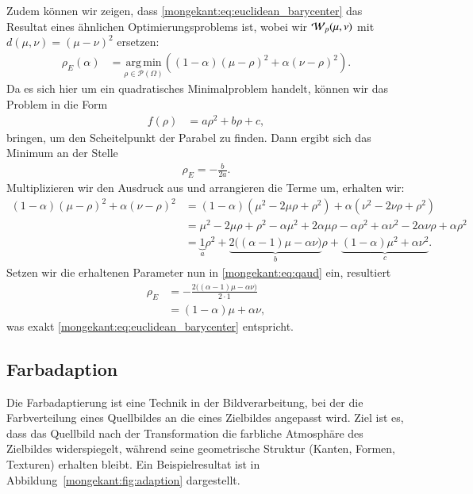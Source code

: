 Zudem können wir zeigen,
dass \eqref{mongekant:eq:euclidean_barycenter} das Resultat eines ähnlichen Optimierungsproblems ist,
wobei wir $\wasserstein(\mu, \nu)$ mit $d(\mu, \nu) = (\mu - \nu)^2$ ersetzen:
\begin{align*}
\rho_E(\alpha)
&=
\underset{\rho \in \mathcal{P}(\Omega)}{\mathrm{arg\,min}}\left(
(1-\alpha) (\mu - \rho)^2
+ \alpha (\nu - \rho)^2
\right)
.
\end{align*}
Da es sich hier um ein quadratisches Minimalproblem handelt,
können wir das Problem in die Form
\begin{align*}
f(\rho)
&=
a \rho^2 + b \rho + c
,
\end{align*}
bringen,
um den Scheitelpunkt der Parabel zu finden.
Dann ergibt sich das Minimum an der Stelle
\begin{align}
\rho_E
=
-\frac{b}{2a}
\label{mongekant:eq:qaud}
.
\end{align}
Multiplizieren wir den Ausdruck aus und 
arrangieren die Terme um,
erhalten wir:
\begin{align*}
(1 - \alpha) (\mu - \rho)^2 
+ \alpha (\nu - \rho)^2
&=
(1 - \alpha) \left(\mu^2 - 2\mu\rho + \rho^2 \right)
+ \alpha \left(\nu^2 - 2\nu\rho + \rho^2 \right)
\\
&=
\mu^2 - 2\mu\rho + \rho^2 - \alpha \mu^2 + 2\alpha\mu\rho - \alpha\rho^2 
+ \alpha \nu^2 - 2\alpha\nu\rho + \alpha\rho^2
\\
&=
\underbrace{1}_{\displaystyle a} \rho^2 
+ \underbrace{2 \bigl((\alpha - 1) \mu - \alpha\nu \bigr)}_{\displaystyle b} \rho
+ \underbrace{(1 - \alpha) \mu^2 + \alpha \nu^2}_{\displaystyle c}
.
\end{align*}
Setzen wir die erhaltenen Parameter nun in \eqref{mongekant:eq:qaud} ein,
resultiert
\begin{align*}
\rho_E
&=
-\frac{2 \bigl(\left(\alpha - 1\right) \mu - \alpha\nu \bigr)}{2 \cdot 1}
\\
&=
(1 - \alpha) \mu + \alpha \nu
,
\end{align*}
was exakt \eqref{mongekant:eq:euclidean_barycenter} entspricht.

\subsection{Farbadaption\label{mongekant:subsection:farbadaption}}

Die Farbadaptierung ist eine Technik in der Bildverarbeitung,
bei der die Farbverteilung eines Quellbildes an die eines Zielbildes angepasst wird.
Ziel ist es,
dass das Quellbild nach der Transformation
die farbliche Atmosphäre des Zielbildes widerspiegelt,
während seine geometrische Struktur (Kanten, Formen, Texturen) erhalten bleibt.
Ein Beispielresultat ist in Abbildung~\ref{mongekant:fig:adaption} dargestellt.

